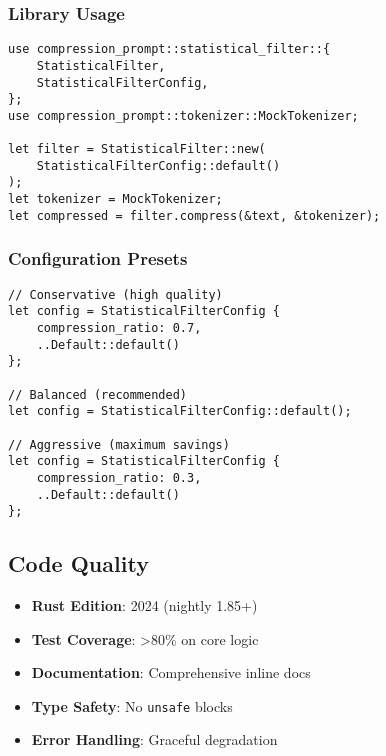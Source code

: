 \subsubsection{Library Usage}

\begin{verbatim}
use compression_prompt::statistical_filter::{
    StatisticalFilter,
    StatisticalFilterConfig,
};
use compression_prompt::tokenizer::MockTokenizer;

let filter = StatisticalFilter::new(
    StatisticalFilterConfig::default()
);
let tokenizer = MockTokenizer;
let compressed = filter.compress(&text, &tokenizer);
\end{verbatim}

\subsubsection{Configuration Presets}

\begin{verbatim}
// Conservative (high quality)
let config = StatisticalFilterConfig {
    compression_ratio: 0.7,
    ..Default::default()
};

// Balanced (recommended)
let config = StatisticalFilterConfig::default();

// Aggressive (maximum savings)
let config = StatisticalFilterConfig {
    compression_ratio: 0.3,
    ..Default::default()
};
\end{verbatim}

\subsection{Code Quality}

\begin{itemize}
    \item \textbf{Rust Edition}: 2024 (nightly 1.85+)
    \item \textbf{Test Coverage}: >80\% on core logic
    \item \textbf{Documentation}: Comprehensive inline docs
    \item \textbf{Type Safety}: No \texttt{unsafe} blocks
    \item \textbf{Error Handling}: Graceful degradation
\end{itemize}
